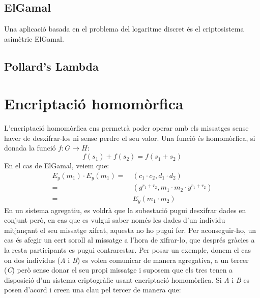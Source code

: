 \documentclass{article}
\begin{document}
\subsection{ElGamal}
Una aplicació basada en el problema del logaritme discret és el criptosistema asimètric ElGamal.
\subsection{Pollard's Lambda}
\section{Encriptació homomòrfica}\label{subsec:homomorfism}
L'encriptació homomòrfica ens permetrà poder operar amb els missatges sense haver de desxifrar-los ni sense perdre el seu valor.
Una funció és homomòrfica, si donada la funció $f: G \rightarrow H$:
\[f(s_1) + f(s_2) = f(s_1+s_2)\]
En el cas de ElGamal, veiem que:
\begin{equation*}
\begin{aligned}
	E_y(m_1) \cdot E_y(m_1) =& \ (c_1 \cdot c_2, d_1 \cdot d_2)\\
	=& \ (g^{r_1 + r_2}, m_1 \cdot m_2 \cdot y^{r_1 + r_2} ) \\
	=& \ E_y(m_1 \cdot m_2)
\end{aligned}
\end{equation*}
En un sistema agregatiu, es voldrà que la subestació pugui desxifrar dades en conjunt però, en cas que es vulgui saber només les dades d'un individu mitjançant el seu missatge xifrat, aquesta no ho pugui fer. Per aconseguir-ho, un cas és afegir un cert soroll al missatge a l'hora de xifrar-lo, que després gràcies a la resta participants es pugui contrarestar. Per posar un exemple, donem el cas on dos individus (\textit{A} i \textit{B}) es volen comunicar de manera agregativa, a un tercer (\textit{C}) però sense donar el seu propi missatge i suposem que els tres tenen a disposició d'un sistema criptogràfic usant encriptació homomòrfica. Si \textit{A} i \textit{B} es posen d'acord i creen una clau pel tercer de manera que:
\end{document}
